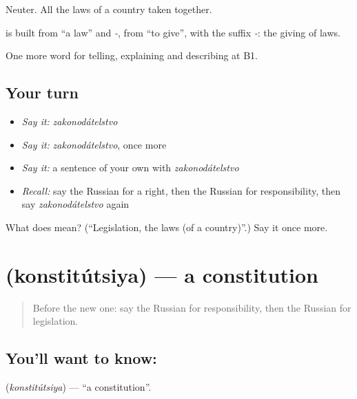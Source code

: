 Neuter. All the laws of a country taken together.

\begin{cousinweb}
\textbf{} is built from \emph{} \textquotedblleft{}a law\textquotedblright{} and \emph{-}, from \emph{} \textquotedblleft{}to give\textquotedblright{}, with the suffix \emph{-}: the giving of laws.
\end{cousinweb}

\begin{grammarlens}[title={What you've built}]
One more word for telling, explaining and describing at B1.
\end{grammarlens}

\subsection*{Your turn}
\begin{itemize}
\raggedright
  \item \emph{Say it:} \emph{zakonodátelstvo}
  \item \emph{Say it:} \emph{zakonodátelstvo}, once more
  \item \emph{Say it:} a sentence of your own with \emph{zakonodátelstvo}
  \item \emph{Recall:} say the Russian for a right, then the Russian for responsibility, then say \emph{zakonodátelstvo} again
\end{itemize}

\begin{tcolorbox}[breakable,colback=teal!4,colframe=teal!35!black,title={Before you move on}]
What does  mean? (\textquotedblleft{}Legislation, the laws (of a country)\textquotedblright{}.) Say it once more.
\end{tcolorbox}
\section[\texorpdfstring{\ru{конституция} (konstitútsiya)}{конституция (konstitútsiya)}]{ (konstitútsiya) — a constitution}

\label{lesson:RU-C391-konstituciya}



\begin{quote}
Before the new one: say the Russian for responsibility, then the Russian for legislation.
\end{quote}

\subsection*{You'll want to know: }
\textbf{} (\emph{konstitútsiya}) — \textquotedblleft{}a constitution\textquotedblright{}.

